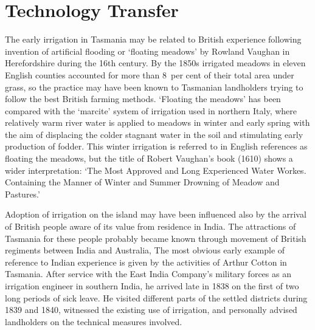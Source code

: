 \section*{Technology Transfer}

The early irrigation in Tasmania may be related to
British experience following invention of artificial
flooding or `floating meadows' by Rowland Vaughan
in Herefordshire during the 16th century.  By the 1850s irrigated
meadows in eleven English counties accounted for more than 8~per cent
of their total area under grass, so the practice may have been known
to Tasmanian landholders trying to follow the best British farming
methods.  `Floating the meadows' has been compared with the `marcite'
system of irrigation used in northern Italy, where
relatively warm river water is applied to meadows in winter and early
spring with the aim of displacing the colder stagnant water in the
soil and stimulating early production of fodder.  This winter
irrigation is referred to in English references as floating the
meadows, but the title of Robert Vaughan's book (1610) shows a wider
interpretation: `The Most Approved and Long Experienced Water Workes.
Containing the Manner of Winter and Summer Drowning of Meadow and
Pastures.'

Adoption of irrigation on the island may have been influenced also by
the arrival of British people aware of its value from residence in
India.  The attractions of Tasmania for these people probably became
known through movement of British regiments between India
and Australia, The most obvious early example of reference to Indian
experience is given by the activities of Arthur Cotton in Tasmania.  After service with the East India Company's military
forces as an irrigation engineer in southern India, he arrived late in
1838 on the first of two long periods of sick leave.  He visited
different parts of the settled districts during 1839 and 1840,
witnessed the existing use of irrigation, and personally advised
landholders on the technical measures
involved.

